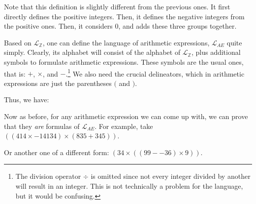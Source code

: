 \begin{remark}
Note that this definition is slightly different from the previous ones. It first directly defines the positive integers. Then, it defines the negative integers from the positive ones. Then, it considers $0$, and adds these three groups together. 
\end{remark}

Based on $\mathcal{L}_\mathbb{Z}$, one can define the language of arithmetic expressions, $\mathcal{L}_{AE}$ quite simply. Clearly, its alphabet will consist of the alphabet of $\mathcal{L}_\mathbb{Z}$, plus additional symbols to formulate arithmetic expressions. These symbols are the usual ones, that is: $+$, $\times$, and $-$.\footnote{The division operator $\div$ is omitted since not every integer divided by another will result in an integer. This is not technically a problem for the language, but it would be confusing.} We also need the crucial delineators, which in arithmetic expressions are just the parentheses $($ and $)$. 

Thus, we have:




Now as before, for any arithmetic expression we can come up with, we can prove that they \textit{are} formulas of $\mathcal{L}_{AE}$. For example, take $((414 \times -14134)\times (835+345))$. 

\begin{center}
\begin{axiomatic}
\end{axiomatic}
\end{center}

Or another one of a different form: $(34 \times ((99- -36)\times 9))$.

\begin{center}
	\begin{axiomatic}
	\end{axiomatic}
\end{center}

